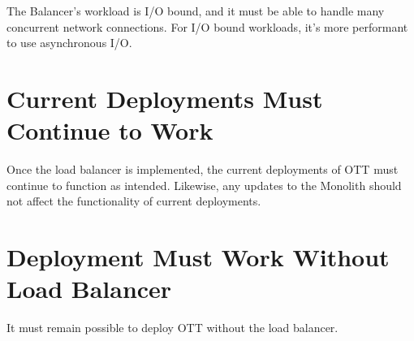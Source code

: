 The Balancer's workload is I/O bound, and it must be able to handle many concurrent network connections. For I/O bound workloads, it's more performant to use asynchronous I/O\cite{async-vs-threads}.

\section{Current Deployments Must Continue to Work}

Once the load balancer is implemented, the current deployments of OTT must continue to function as intended. Likewise, any updates to the Monolith should not affect the functionality of current deployments.

\section{Deployment Must Work Without Load Balancer}

It must remain possible to deploy OTT without the load balancer. 